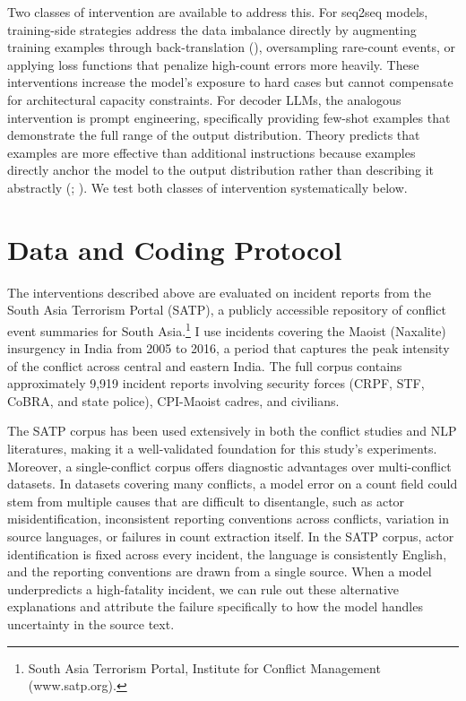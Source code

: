 \documentclass[
  11pt,
]{article}
\begin{document}
Two classes of intervention are available to address this. For seq2seq
models, training-side strategies address the data imbalance directly by
augmenting training examples through back-translation
(),
oversampling rare-count events, or applying loss functions that penalize
high-count errors more heavily. These interventions increase the model's
exposure to hard cases but cannot compensate for architectural capacity
constraints. For decoder LLMs, the analogous intervention is prompt
engineering, specifically providing few-shot examples that demonstrate
the full range of the output distribution. Theory predicts that examples
are more effective than additional instructions because examples
directly anchor the model to the output distribution rather than
describing it abstractly (;
). We test both classes of
intervention systematically below.

\section{Data and Coding Protocol}\label{data-and-coding-protocol}

The interventions described above are evaluated on incident reports from
the South Asia Terrorism Portal (SATP), a publicly accessible repository
of conflict event summaries for South Asia.\footnote{South Asia
  Terrorism Portal, Institute for Conflict Management (www.satp.org).} I
use incidents covering the Maoist (Naxalite) insurgency in India from
2005 to 2016, a period that captures the peak intensity of the conflict
across central and eastern India. The full corpus contains approximately
9,919 incident reports involving security forces (CRPF, STF, CoBRA, and
state police), CPI-Maoist cadres, and civilians.

The SATP corpus has been used extensively in both the conflict studies
and NLP literatures, making it a well-validated foundation for this
study's experiments. Moreover, a single-conflict corpus offers
diagnostic advantages over multi-conflict datasets. In datasets covering
many conflicts, a model error on a count field could stem from multiple
causes that are difficult to disentangle, such as actor
misidentification, inconsistent reporting conventions across conflicts,
variation in source languages, or failures in count extraction itself.
In the SATP corpus, actor identification is fixed across every incident,
the language is consistently English, and the reporting conventions are
drawn from a single source. When a model underpredicts a high-fatality
incident, we can rule out these alternative explanations and attribute
the failure specifically to how the model handles uncertainty in the
source text.
\end{document}
